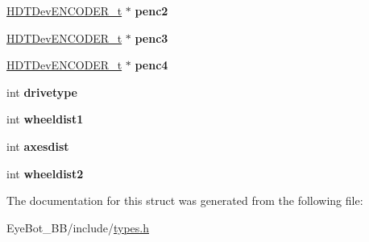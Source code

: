 \begin{DoxyCompactItemize}
\item 
\hypertarget{struct___h_d_t_dev_d_r_i_v_e__t_a04efd9392ec4ab946606d0fc2eed295e}{\hyperlink{struct___h_d_t_dev_e_n_c_o_d_e_r__t}{\-H\-D\-T\-Dev\-E\-N\-C\-O\-D\-E\-R\-\_\-t} $\ast$ {\bfseries penc2}}\label{struct___h_d_t_dev_d_r_i_v_e__t_a04efd9392ec4ab946606d0fc2eed295e}

\item 
\hypertarget{struct___h_d_t_dev_d_r_i_v_e__t_a7fa4a99f15b1a7f0f25f833783d73106}{\hyperlink{struct___h_d_t_dev_e_n_c_o_d_e_r__t}{\-H\-D\-T\-Dev\-E\-N\-C\-O\-D\-E\-R\-\_\-t} $\ast$ {\bfseries penc3}}\label{struct___h_d_t_dev_d_r_i_v_e__t_a7fa4a99f15b1a7f0f25f833783d73106}

\item 
\hypertarget{struct___h_d_t_dev_d_r_i_v_e__t_ad9302e6183c10f6b6f649d2bcdd95959}{\hyperlink{struct___h_d_t_dev_e_n_c_o_d_e_r__t}{\-H\-D\-T\-Dev\-E\-N\-C\-O\-D\-E\-R\-\_\-t} $\ast$ {\bfseries penc4}}\label{struct___h_d_t_dev_d_r_i_v_e__t_ad9302e6183c10f6b6f649d2bcdd95959}

\item 
\hypertarget{struct___h_d_t_dev_d_r_i_v_e__t_a3d8e4b571a17516fa55a9bc1cb93c3fa}{int {\bfseries drivetype}}\label{struct___h_d_t_dev_d_r_i_v_e__t_a3d8e4b571a17516fa55a9bc1cb93c3fa}

\item 
\hypertarget{struct___h_d_t_dev_d_r_i_v_e__t_a2cedba3a4797528d013ef34ca53eb55a}{int {\bfseries wheeldist1}}\label{struct___h_d_t_dev_d_r_i_v_e__t_a2cedba3a4797528d013ef34ca53eb55a}

\item 
\hypertarget{struct___h_d_t_dev_d_r_i_v_e__t_aa72e75a0bf17521e4aa7ace887dcaf2b}{int {\bfseries axesdist}}\label{struct___h_d_t_dev_d_r_i_v_e__t_aa72e75a0bf17521e4aa7ace887dcaf2b}

\item 
\hypertarget{struct___h_d_t_dev_d_r_i_v_e__t_a8147389ce46f1f481ed940af82825846}{int {\bfseries wheeldist2}}\label{struct___h_d_t_dev_d_r_i_v_e__t_a8147389ce46f1f481ed940af82825846}

\end{DoxyCompactItemize}


\-The documentation for this struct was generated from the following file\-:\begin{DoxyCompactItemize}
\item 
\-Eye\-Bot\-\_\-\-B\-B/include/\hyperlink{types_8h}{types.\-h}\end{DoxyCompactItemize}
